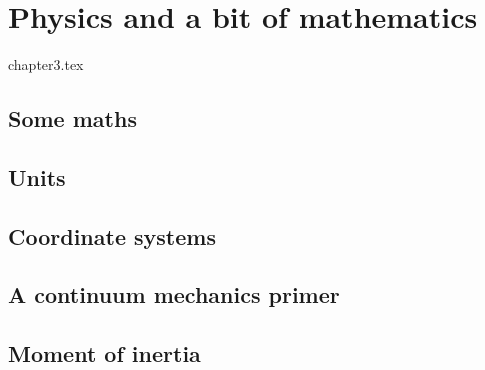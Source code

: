 
\chapter{Physics and a bit of mathematics} \label{chapt3} %

\begin{flushright} {\tiny {\color{gray} chapter3.tex}} \end{flushright}

\section{Some maths} 
\section{Units}  %
\section{Coordinate systems}  \label{ss:coordsys} %
\section{A continuum mechanics primer} %

\newpage
\section{Moment of inertia}  %
